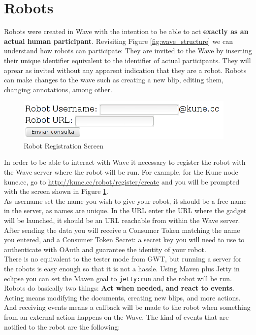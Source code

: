 \section{Robots}
Robots were created in Wave with the intention to be able to act \textbf{exactly as an actual human participant}. Revisiting Figure \ref{fig:wave_structure} we can understand how robots can participate: They are invited to the Wave by inserting their unique identifier equivalent to the identifier of actual participants. They will aprear as invited without any apparent indication that they are a robot. Robots can make changes to the wave such as creating a new blip, editing them, changing annotations, among other.\\[.2cm]
\begin{figure}[h]
  \center
    \includegraphics[keepaspectratio, scale=0.6]{Media/Captures/Wave/RegisterRobot.png}
  \caption{Robot Registration Screen}
  \label{fig:robot_register}
\end{figure}
In order to be able to interact with Wave it necessary to register the robot with the Wave server where the robot will be run. For example, for the Kune node kune.cc, go to \url{http://kune.cc/robot/register/create} and you will be prompted with the screen shown in Figure \ref{fig:robot_register}.\\[.2cm]
As username set the name you wish to give your robot, it should be a free name in the server, as names are unique. In the URL enter the URL where the gadget will be launched, it should be an URL reachable from within the Wave server. After sending the data you will receive a Consumer Token matching the name you entered, and a Consumer Token Secret: a secret key you will need to use to authenticate with OAuth and guarantee the identity of your robot.\\[.2cm]
There is no equivalent to the tester mode from GWT, but running a server for the robots is easy enough so that it is not a hassle. Using Maven plus Jetty in eclipse you can set the Maven goal to \verb|jetty:run| and the robot will be run.\\[.2cm]
Robots do basically two things: \textbf{Act when needed, and react to events}. Acting means modifying the documents, creating new blips, and more actions. And receiving events means a callback will be made to the robot when something from an external action happens on the Wave. The kind of events that are notified to the robot are the following:
